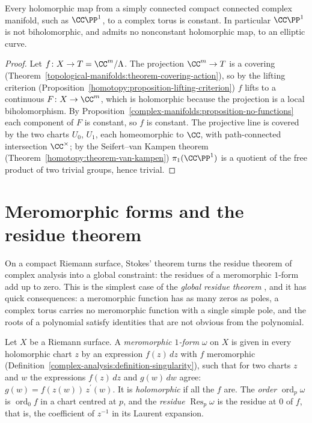 \begin{corollary}\label{complex-manifolds:corollary-maps-to-tori}
Every holomorphic map from a simply connected compact connected complex manifold, such as $\CC\PP^1$, to a complex torus is constant. In particular $\CC\PP^1$ is not biholomorphic, and admits no nonconstant holomorphic
map, to an elliptic curve.
\end{corollary}

\begin{proof}
Let $f \colon X \to T = \CC^m/\Lambda$. The projection $\CC^m \to T$ is a covering (Theorem~\ref{topological-manifolds:theorem-covering-action}), so by the lifting criterion
(Proposition~\ref{homotopy:proposition-lifting-criterion}) $f$ lifts to a continuous $F \colon X \to \CC^m$, which is holomorphic because the projection is a local biholomorphism. By
Proposition~\ref{complex-manifolds:proposition-no-functions} each component of $F$ is constant, so $f$ is constant. The projective line is covered by the two charts $U_0$, $U_1$, each homeomorphic to $\CC$, with
path-connected intersection $\CC^\times$; by the Seifert--van Kampen theorem (Theorem~\ref{homotopy:theorem-van-kampen}) $\pi_1(\CC\PP^1)$ is a quotient of the free product of two trivial groups, hence trivial.
\end{proof}

\section{Meromorphic forms and the residue theorem}\label{complex-manifolds:section-residues}

On a compact Riemann surface, Stokes' theorem turns the residue theorem of complex analysis into a global constraint: the residues of a meromorphic $1$-form add up to zero. This is
the simplest case of the \emph{global residue theorem} \cite[Chapter 5]{griffiths-harris}, and it has quick consequences: a meromorphic function has as many zeros as poles, a complex torus
carries no meromorphic function with a single simple pole, and the roots of a polynomial satisfy identities that are not obvious from the polynomial.

\begin{definition}\label{complex-manifolds:definition-meromorphic-form}
Let $X$ be a Riemann surface. A \emph{meromorphic $1$-form} $\omega$ on $X$ is given in every holomorphic chart $z$ by an expression $f(z)\,dz$ with $f$ meromorphic
(Definition~\ref{complex-analysis:definition-singularity}), such that for two charts $z$ and $w$ the expressions $f(z)\,dz$ and $g(w)\,dw$ agree: $g(w) = f(z(w))\,z^{\prime}(w)$. It is
\emph{holomorphic} if all the $f$ are. The \emph{order} $\operatorname{ord}_p\omega$ is $\operatorname{ord}_0f$ in a chart centred at $p$, and the \emph{residue} $\operatorname{Res}_p\omega$ is the
residue at $0$ of $f$, that is, the coefficient of $z^{-1}$ in its Laurent expansion.
\end{definition}

